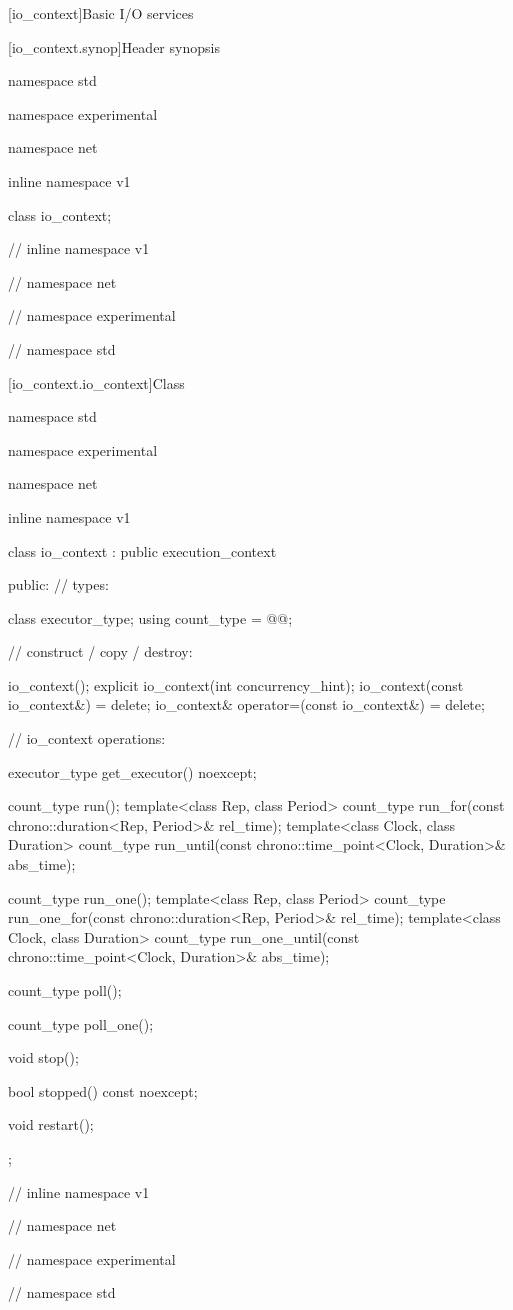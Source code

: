 
[io_context]{Basic I/O services}


%
[io_context.synop]{Header  synopsis}

\begin{codeblock}
namespace std {
namespace experimental {
namespace net {
inline namespace v1 {

  class io_context;

} // inline namespace v1
} // namespace net
} // namespace experimental
} // namespace std
\end{codeblock}



[io_context.io_context]{Class }

%
\begin{codeblock}
namespace std {
namespace experimental {
namespace net {
inline namespace v1 {

  class io_context : public execution_context
  {
  public:
    // types:

    class executor_type;
    using count_type = @@;

    // construct / copy / destroy:

    io_context();
    explicit io_context(int concurrency_hint);
    io_context(const io_context&) = delete;
    io_context& operator=(const io_context&) = delete;

    // io_context operations:

    executor_type get_executor() noexcept;

    count_type run();
    template<class Rep, class Period>
      count_type run_for(const chrono::duration<Rep, Period>& rel_time);
    template<class Clock, class Duration>
      count_type run_until(const chrono::time_point<Clock, Duration>& abs_time);

    count_type run_one();
    template<class Rep, class Period>
      count_type run_one_for(const chrono::duration<Rep, Period>& rel_time);
    template<class Clock, class Duration>
      count_type run_one_until(const chrono::time_point<Clock, Duration>& abs_time);

    count_type poll();

    count_type poll_one();

    void stop();

    bool stopped() const noexcept;

    void restart();
  };

} // inline namespace v1
} // namespace net
} // namespace experimental
} // namespace std
\end{codeblock}

